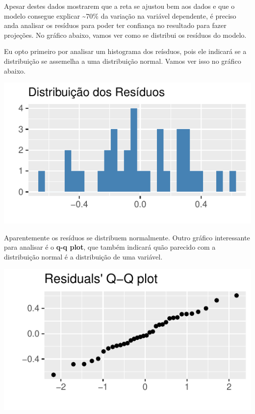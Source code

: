 \documentclass[
  12pt,
  a4paper,
]{article}
\begin{document}
Apesar destes dados mostrarem que a reta se ajustou bem aos dados e que o modelo consegue explicar \textasciitilde70\% da variação na variável dependente, é preciso anda analisar os resíduos para poder ter confiança no resultado para fazer projeções. No gráfico abaixo, vamos ver como se distribui os resíduos do modelo.

Eu opto primeiro por analisar um histograma dos reísduos, pois ele indicará se a distribuição se assemelha a uma distribuição normal. Vamos ver isso no gráfico abaixo.

\begin{center}\includegraphics{article_files/figure-latex/unnamed-chunk-11-1} \end{center}

Aparentemente os resíduos se distribuem normalmente. Outro gráfico interessante para analisar é o \textbf{q-q plot}, que também indicará quão parecido com a distribuição normal é a distribuição de uma variável.

\begin{center}\includegraphics{article_files/figure-latex/unnamed-chunk-12-1} \end{center}
\end{document}

